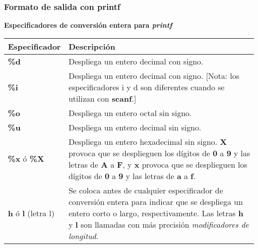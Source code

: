 \begin{frame}[t]
\frametitle{Formato de salida con printf}
\textbf{Especificadores de conversión entera para \textit{printf}}\\ \vspace{5mm}
\scriptsize
\begin{center}
\begin{tabular}{lp{7.5cm}}
	\toprule
	\textbf{Especificador} & \textbf{Descripción}\\
	\midrule
	\textbf{\%d} & Despliega un entero decimal con signo.\\ 
	\textbf{\%i} & Despliega un entero decimal con signo. [Nota: los especificadores i y d son diferentes cuando se utilizan con \textbf{scanf}.]\\ 
	\textbf{\%o} & Despliega un entero octal sin signo.\\
	\textbf{\%u} & Despliega un entero decimal sin signo. \\
	\textbf{\%x} ó \textbf{\%X} & Despliega un entero hexadecimal sin signo. \textbf{X} provoca que se desplieguen los dígitos de \textbf{0} a \textbf{9} y las letras de \textbf{A} a \textbf{F}, y \textbf{x} provoca que se desplieguen los dígitos de \textbf{0} a \textbf{9} y las letras de \textbf{a} a \textbf{f}.\\ 
	\textbf{h} ó \textbf{l} (letra l) & Se coloca antes de cualquier especificador de conversión entera para indicar que se despliega un entero corto o largo, respectivamente. Las letras \textbf{h} y \textbf{l} son llamadas con más precisión \textit{modificadores de longitud}.\\
	\bottomrule
\end{tabular}
\end{center}
\end{frame}
